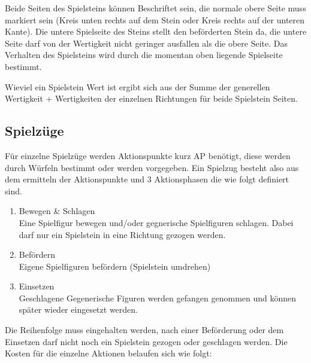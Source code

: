 \documentclass{article}
\begin{document}
	\vspace{0.3cm}
    
    \begin{flushleft}
    
    Beide Seiten des Spielsteins können Beschriftet sein, die normale obere Seite muss 
    markiert sein (Kreis unten rechts auf dem Stein oder Kreis rechts auf der unteren Kante).
	Die untere Spielseite des Steins stellt den beförderten Stein da, die untere Seite darf 
	von der Wertigkeit nicht geringer ausfallen als die obere Seite.
	Das Verhalten des Spielsteins wird durch die momentan oben liegende Spielseite bestimmt.
	
	
	Wieviel ein Spielstein Wert ist ergibt sich aus der Summe der generellen Wertigkeit + Wertigkeiten der einzelnen Richtungen für beide Spielstein Seiten.
	\end{flushleft}
	
	
\subsection{Spielzüge}

	Für einzelne Spielzüge werden Aktionspunkte kurz AP benötigt, diese werden durch Würfeln bestimmt oder werden vorgegeben.
	Ein Spielzug besteht also aus dem ermitteln der Aktionspunkte und 3 Aktionsphasen die wie folgt definiert sind.
	\begin{enumerate}
	\item Bewegen \& Schlagen \\
		  Eine Spielfigur bewegen und/oder gegnerische Spielfiguren schlagen. Dabei darf nur
		  ein Spielstein in eine Richtung gezogen werden.
	\item Befördern \\
		  Eigene Spielfiguren befördern (Spielstein umdrehen)
	\item Einsetzen \\
		  Geschlagene Gegenerische Figuren werden gefangen genommen und können später
		  wieder eingesetzt werden.
	\end{enumerate}

	Die Reihenfolge muss eingehalten werden, nach einer Beförderung oder dem Einsetzen darf nicht noch ein 
	Spielstein gezogen oder geschlagen werden.
	Die Kosten für die einzelne Aktionen belaufen sich wie folgt:
	
\end{document}
